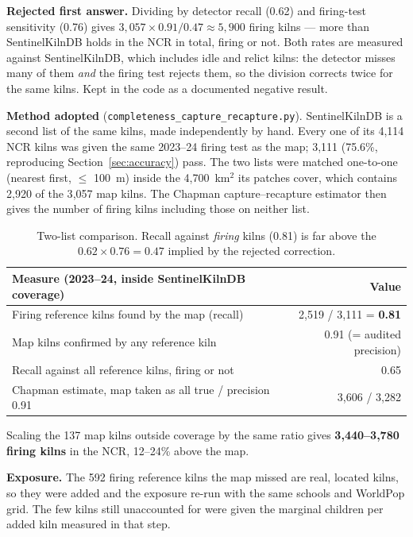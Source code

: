 \documentclass[11pt,a4paper]{article}
\begin{document}
\textbf{Rejected first answer.} Dividing by detector recall (0.62) and
firing-test sensitivity (0.76) gives $3{,}057 \times 0.91 / 0.47 \approx 5{,}900$
firing kilns --- more than SentinelKilnDB holds in the NCR in total, firing or
not. Both rates are measured against SentinelKilnDB, which includes idle and
relict kilns: the detector misses many of them \emph{and} the firing test rejects
them, so the division corrects twice for the same kilns. Kept in the code as a
documented negative result.

\textbf{Method adopted} (\texttt{completeness\_capture\_recapture.py}).
SentinelKilnDB is a second list of the same kilns, made independently by hand.
Every one of its 4{,}114 NCR kilns was given the same 2023--24 firing test as the
map; 3{,}111 (75.6\%, reproducing Section~\ref{sec:accuracy}) pass. The two
lists were matched one-to-one (nearest first, $\leq$ 100~m) inside the
4{,}700~km$^2$ its patches cover, which contains 2{,}920 of the 3{,}057 map kilns.
The Chapman capture--recapture estimator then gives the number of firing kilns
including those on neither list.

\begin{table}[H]
\centering\small
\begin{tabular}{@{}lr@{}}
\toprule
Measure (2023--24, inside SentinelKilnDB coverage) & Value \\
\midrule
Firing reference kilns found by the map (recall)             & 2{,}519 / 3{,}111 = \textbf{0.81} \\
Map kilns confirmed by any reference kiln                     & 0.91 (= audited precision) \\
Recall against all reference kilns, firing or not            & 0.65 \\
Chapman estimate, map taken as all true / precision 0.91     & 3{,}606 / 3{,}282 \\
\bottomrule
\end{tabular}
\caption{Two-list comparison. Recall against \emph{firing} kilns (0.81) is far
above the $0.62 \times 0.76 = 0.47$ implied by the rejected correction.}
\end{table}

Scaling the 137 map kilns outside coverage by the same ratio gives
\textbf{3{,}440--3{,}780 firing kilns} in the NCR, 12--24\% above the map.

\textbf{Exposure.} The 592 firing reference kilns the map missed are real,
located kilns, so they were added and the exposure re-run with the same schools
and WorldPop grid. The few kilns still unaccounted for were given the marginal
children per added kiln measured in that step.
\end{document}
